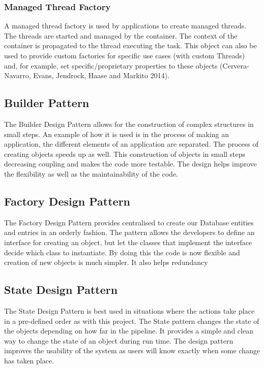 \documentclass[12pt]{article}
\begin{document}
\subsubsection{Managed Thread Factory}
A managed thread factory is used by applications to create managed threads. The threads are started and managed by the container. The context of the container is propagated to the thread executing the task. This object can also be used to provide custom factories for specific use cases (with custom Threads) and, for example, set specific/proprietary properties to these objects (Cervera-Navarro, Evans, Jendrock, Haase and Markito 2014).

\subsection{Builder Pattern}
The Builder Design Pattern allows for the construction of complex structures in small steps. An example of how it is used is in the process of making an application, the different elements of an application are separated. The process of creating objects speeds up as well. This construction of objects in small steps decreasing coupling and makes the code more testable. The design helps improve the flexibility as well as the maintainability of the code.  

\subsection{Factory Design Pattern}
The Factory Design Pattern provides centralised to create our Database entities and entries in an orderly fashion. The pattern allows the developers to define an interface for creating an object, but let the classes that implement the interface decide which class to instantiate. By doing this the code is now flexible and creation of new objects is much simpler. It also helps redundancy 

\subsection{State Design Pattern}
The State Design Pattern is best used in situations where the actions take place in a pre-defined order as with this project. The State pattern changes the state of the objects depending on how far in the pipeline. It provides a simple and clean way to change the state of an object during run time. The design pattern improves the usability of the system as users will know exactly when some change has taken place. 
\end{document}
